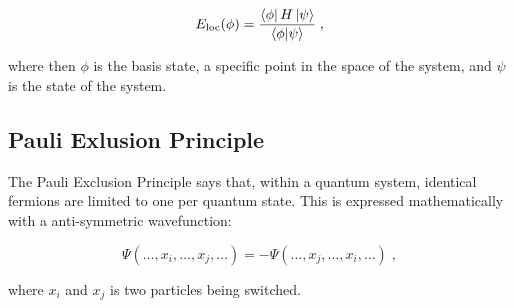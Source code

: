 \begin{equation}
    E_{\text{loc}}(\phi) = \frac{\bra{\phi}H\ket{\psi}}{\braket{\phi}{\psi}} \; ,
\end{equation}

where then $\phi$ is the basis state, a specific point in the space of the system, and $\psi$ is the state of the system.

\subsection{Pauli Exlusion Principle}

The Pauli Exclusion Principle says that, within a quantum system, identical fermions are limited to one per quantum state. This is expressed mathematically with a anti-symmetric wavefunction:

\begin{equation}
    \Psi(\dots,x_i,\dots,x_j,\dots) =-\Psi(\dots,x_j,\dots,x_i,\dots) \; ,
\end{equation}

where $x_i$ and $x_j$ is two particles being switched.
